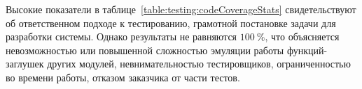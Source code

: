 Высокие показатели в таблице~\ref{table:testing:codeCoverageStats} свидетельствуют об ответственном подходе к тестированию, грамотной постановке задачи для разработки системы. Однако результаты не равняются $ 100 \ \%$, что объясняется невозможностью или повышенной сложностью эмуляции работы функций-заглушек других модулей, невнимательностью тестировщиков, ограниченностью во времени работы, отказом заказчика от части тестов.
